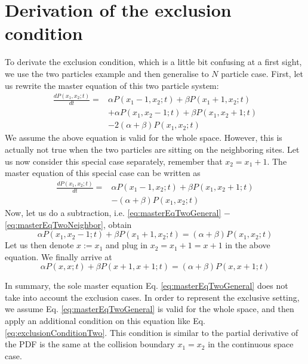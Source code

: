 \documentclass[12pt,a4paper]{article}
\begin{document}
\section{Derivation of the exclusion condition}
To derivate the exclusion condition, which is a little bit confusing at a first sight, we use the two particles example and then generalise to $N$ particle case.
First, let us rewrite the master equation of this two particle system:
\begin{equation}
    \begin{aligned}
        \label{eq:masterEqTwoGeneral}
    \frac{d P(x_1, x_2; t)}{dt} = & \alpha P(x_1-1,x_2;t) + \beta P(x_1+1,x_2;t) \\ 
    & + \alpha P(x_1, x_2-1; t) + \beta P(x_1, x_2+1; t)  \\ 
    & - 2(\alpha+\beta)P(x_1, x_2; t)
    \end{aligned}
\end{equation}
We assume the above equation is valid for the whole space. However, this is actually not true when the two particles are sitting on the neighboring sites. Let us now consider this special case separately, remember that $x_2 = x_1 + 1$. The master equation of this special case can be written as
\begin{equation}
    \begin{aligned}
        \label{eq:masterEqTwoNeighbor}
        \frac{d P(x_1, x_2; t)}{dt} = 
        & \alpha P(x_1-1,x_2;t) + \beta P(x_1, x_2+1; t)  \\ 
    & - (\alpha+\beta)P(x_1, x_2; t)
    \end{aligned}
\end{equation}
Now, let us do a subtraction, i.e. \eqref{eq:masterEqTwoGeneral} $-$ \eqref{eq:masterEqTwoNeighbor}, obtain
\begin{equation}
    \alpha P(x_1, x_2-1; t) + \beta P(x_1 + 1, x_2; t) = (\alpha + \beta)P(x_1, x_2; t)
\end{equation}
Let us then denote $x:=x_1$ and plug in $x_2 = x_1+1 = x+1$ in the above equation. We finally arrive at
\begin{equation}
    \label{eq:exclusionConditionTwo}
    \alpha P(x, x; t) + \beta P(x+1, x+1; t) = (\alpha + \beta)P(x, x+1; t)
\end{equation}

In summary, the sole master equation Eq. \eqref{eq:masterEqTwoGeneral} does not take into account the exclusion cases. In order to represent the exclusive setting, we assume Eq. \eqref{eq:masterEqTwoGeneral} is valid for the whole space, and then apply an additional condition on this equation like Eq. \eqref{eq:exclusionConditionTwo}. This condition is similar to the partial derivative of the PDF is the same at the collision boundary $x_1 = x_2$ in the continuous space case. 
\end{document}
